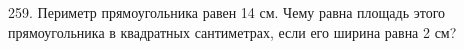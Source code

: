 259. Периметр прямоугольника равен 14 см. Чему равна площадь этого прямоугольника в квадратных сантиметрах, если его ширина равна 2 см?\\
